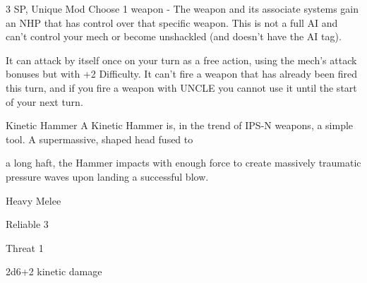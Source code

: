 3 SP, Unique
Mod
Choose 1 weapon - The weapon and its associate systems gain an NHP that has control over
that specific weapon. This is not a full AI and can’t control your mech or become unshackled
(and doesn’t have the AI tag).


It can attack by itself once on your turn as a free action, using the mech’s attack bonuses but
with +2 Difficulty. It can’t fire a weapon that has already been fired this turn, and if you fire a
weapon with UNCLE you cannot use it until the start of your next turn.


Kinetic Hammer
A Kinetic Hammer is, in the trend of IPS-N weapons, a simple tool. A supermassive, shaped head fused to

a long haft, the Hammer impacts with enough force to create massively traumatic pressure waves upon
landing a successful blow.

Heavy Melee

Reliable 3

Threat 1

2d6+2 kinetic damage

